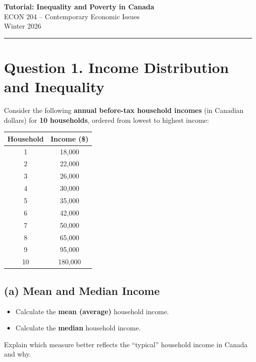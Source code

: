 \documentclass[11pt]{article}
\begin{document}
\begin{center}
{\Large \textbf{Tutorial: Inequality and Poverty in Canada}}\\
\vspace{1em}
{\large ECON 204 -- Contemporary Economic Issues}\\
\vspace{1em}
{\large Winter 2026}
\end{center}
\hrule
\vspace{1em}


\section*{Question 1. Income Distribution and Inequality}

Consider the following \textbf{annual before-tax household incomes} (in Canadian dollars) for \textbf{10 households}, ordered from lowest to highest income:

\begin{center}
\begin{tabular}{cc}
\toprule
\textbf{Household} & \textbf{Income (\$)} \\
\midrule
1 & 18{,}000 \\
2 & 22{,}000 \\
3 & 26{,}000 \\
4 & 30{,}000 \\
5 & 35{,}000 \\
6 & 42{,}000 \\
7 & 50{,}000 \\
8 & 65{,}000 \\
9 & 95{,}000 \\
10 & 180{,}000 \\
\bottomrule
\end{tabular}
\end{center}

\subsection*{(a) Mean and Median Income}

\begin{itemize}
\item Calculate the \textbf{mean (average)} household income.
\item Calculate the \textbf{median} household income.
\end{itemize}

Explain which measure better reflects the ``typical'' household income in Canada and why.
\end{document}
